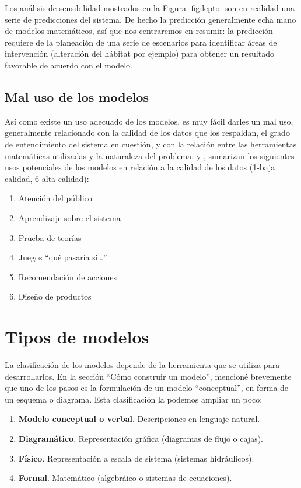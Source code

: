 \documentclass[
]{book}
\providecommand{\tightlist}{%
  \setlength{\itemsep}{0pt}\setlength{\parskip}{0pt}}
\begin{document}
Los análisis de sensibilidad mostrados en la Figura \ref{fig:lepto} son en realidad una serie de predicciones del sistema. De hecho la predicción generalmente echa mano de modelos matemáticos, así que nos centraremos en resumir: la predicción requiere de la planeación de una serie de escenarios para identificar áreas de intervención (alteración del hábitat por ejemplo) para obtener un resultado favorable de acuerdo con el modelo.

\hypertarget{mal-uso-de-los-modelos}{%
\subsection{Mal uso de los modelos}\label{mal-uso-de-los-modelos}}

Así como existe un uso adecuado de los modelos, es muy fácil darles un mal uso, generalmente relacionado con la calidad de los datos que los respaldan, el grado de entendimiento del sistema en cuestión, y con la relación entre las herramientas matemáticas utilizadas y la naturaleza del problema. \citet{holling1978adaptive} y \citet{karplus1975place}, sumarizan los siguientes usos potenciales de los modelos en relación a la calidad de los datos (1-baja calidad, 6-alta calidad):

\begin{enumerate}
\def\labelenumi{\arabic{enumi}.}
\tightlist
\item
  Atención del público
\item
  Aprendizaje sobre el sistema
\item
  Prueba de teorías
\item
  Juegos ``qué pasaría si\ldots{}''
\item
  Recomendación de acciones
\item
  Diseño de productos
\end{enumerate}

\hypertarget{tipos-de-modelos}{%
\section{Tipos de modelos}\label{tipos-de-modelos}}

La clasificación de los modelos depende de la herramienta que se utiliza para desarrollarlos. En la sección ``Cómo construir un modelo'', mencioné brevemente que uno de los pasos es la formulación de un modelo ``conceptual'', en forma de un esquema o diagrama. Esta clasificación la podemos ampliar un poco:

\begin{enumerate}
\def\labelenumi{\arabic{enumi}.}
\tightlist
\item
  \textbf{Modelo conceptual o verbal}. Descripciones en lenguaje natural.
\item
  \textbf{Diagramático}. Representación gráfica (diagramas de flujo o cajas).
\item
  \textbf{Físico}. Representación a escala de sistema (sistemas hidráulicos).
\item
  \textbf{Formal}. Matemático (algebráico o sistemas de ecuaciones).
\end{enumerate}
\end{document}
